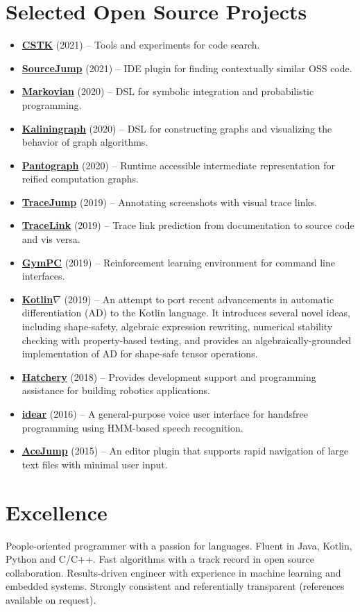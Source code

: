 \documentclass[letterpaper,11pt]{article}
\newcommand{\resumeItem}[2]{
  \item\small{\textbf{#1}{ #2 }}
}
\newcommand{\resumeSubItem}[2]{\resumeItem{#1}{#2}}
\newcommand{\resumeSubHeadingListStart}{\begin{itemize}[leftmargin=*]}
\newcommand{\resumeSubHeadingListEnd}{\end{itemize}}
\begin{document}
\begin{justify}
\section{Selected Open Source Projects}
\resumeSubHeadingListStart
\resumeSubItem{\href{https://github.com/breandan/CSTK}{CSTK}}{(2021) -- Tools and experiments for code search.}
\resumeSubItem{\href{https://github.com/acejump/sourcejump}{SourceJump}}{(2021) -- IDE plugin for finding contextually similar OSS code.}
\resumeSubItem{\href{https://github.com/breandan/markovian}{Markovian}}{(2020) -- DSL for symbolic integration and probabilistic programming.}
\resumeSubItem{\href{https://github.com/breandan/kaliningraph}{Kaliningraph}}{(2020) -- DSL for constructing graphs and visualizing the behavior of graph algorithms.}
\resumeSubItem{\href{https://github.com/breandan/pantograph}{Pantograph}}{(2020) -- Runtime accessible intermediate representation for reified computation graphs.}
\resumeSubItem{\href{https://github.com/acejump/tracejump}{TraceJump}}{(2019) -- Annotating screenshots with visual trace links.}
\resumeSubItem{\href{https://github.com/breandan/tracelink}{TraceLink}}{(2019) -- Trace link prediction from documentation to source code and vis versa.}
\resumeSubItem{\href{https://github.com/breandan/gym-pc}{GymPC}}{(2019) -- Reinforcement learning environment for command line interfaces.}
\resumeSubItem{\href{https://github.com/breandan/kotlingrad}{Kotlin$\nabla$}}{(2019) -- An attempt to port recent advancements in automatic differentiation (AD) to the Kotlin language. It introduces several novel ideas, including shape-safety, algebraic expression rewriting, numerical stability checking with property-based testing, and provides an algebraically-grounded implementation of AD for shape-safe tensor operations.}
\resumeSubItem{\href{https://github.com/duckietown/hatchery}{Hatchery}}{(2018) -- Provides development support and programming assistance for building robotics applications.}
\resumeSubItem{\href{https://github.com/OpenASR/idear}{idear}}{(2016) -- A general-purpose voice user interface for handsfree programming using HMM-based speech recognition.}
\resumeSubItem{\href{https://github.com/acejump/AceJump}{AceJump}}{(2015) -- An editor plugin that supports rapid navigation of large text files with minimal user input.}
\resumeSubHeadingListEnd

\section{Excellence}
People-oriented programmer with a passion for languages. Fluent in Java, Kotlin, Python and C/C++. Fast algorithms with a track record in open source collaboration. Results-driven engineer with experience in machine learning and embedded systems. Strongly consistent and referentially transparent (references available on request).
\end{justify}
\end{document}
